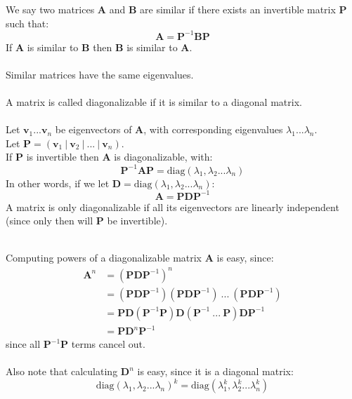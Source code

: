 \documentclass{scrartcl}
\renewcommand{\vec}[1]{\mathbf{#1}}
\begin{document}
We say two matrices $ \vec{A} $ and $ \vec{B} $ are similar if there exists an invertible matrix $ \vec{P} $ such that:
\begin{equation}
\vec{A} = \vec{P}^{-1} \vec{B} \vec{P}
\end{equation}
If $ \vec{A} $ is similar to $ \vec{B} $ then $ \vec{B} $ is similar to $ \vec{A} $.
\\\\
Similar matrices have the same eigenvalues.
\\\\
A matrix is called diagonalizable if it is similar to a diagonal matrix.
\\\\
Let $ \vec{v}_{1}...\vec{v}_{n} $ be eigenvectors of $ \vec{A} $, with corresponding eigenvalues $ \lambda_{1} ... \lambda_{n} $.
\\
Let $ \vec{P} = (\vec{v}_{1} \ | \ \vec{v}_{2} \ | \ ... \ | \ \vec{v}_{n}) $.
\\
If $ \vec{P} $ is invertible then $ \vec{A} $ is diagonalizable, with:
\begin{equation}
\vec{P}^{-1} \vec{A} \vec{P} = \textrm{diag}(\lambda_{1}, \lambda_{2}...\lambda_{n})
\end{equation}
In other words, if we let $ \vec{D} = \textrm{diag}(\lambda_{1}, \lambda_{2}...\lambda_{n}) $:
\begin{equation}
\vec{A} = \vec{P} \vec{D} \vec{P}^{-1}
\end{equation}
A matrix is only diagonalizable if all its eigenvectors are linearly independent (since only then will $ \vec{P} $ be invertible).
\\\\
\begin{tcolorbox}
Computing powers of a diagonalizable matrix $ \vec{A} $ is easy, since:
\begin{align}
\vec{A}^{n} & = (\vec{P} \vec{D} \vec{P}^{-1})^{n} \\
& = (\vec{P} \vec{D} \vec{P}^{-1}) (\vec{P} \vec{D} \vec{P}^{-1}) \ ... \ (\vec{P} \vec{D} \vec{P}^{-1}) \\
& = \vec{P} \vec{D} (\vec{P}^{-1} \vec{P}) \vec{D} (\vec{P}^{-1} \ ... \ \vec{P}) \vec{D} \vec{P}^{-1} \\
& = \vec{P} \vec{D}^{n} \vec{P}^{-1}
\end{align}
since all $ \vec{P}^{-1} \vec{P} $ terms cancel out.
\\\\
Also note that calculating $ \vec{D}^{n} $ is easy, since it is a diagonal matrix:
\begin{equation}
\textrm{diag}(\lambda_{1}, \lambda_{2}...\lambda_{n})^{k} = \textrm{diag}(\lambda_{1}^{k}, \lambda_{2}^{k}...\lambda_{n}^{k})
\end{equation}
\end{tcolorbox}
\end{document}
